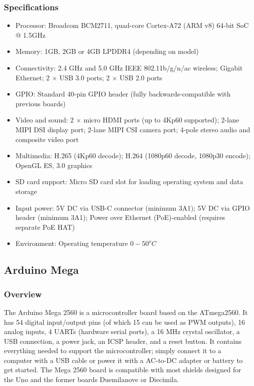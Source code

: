 \subsubsection{Specifications}
\begin{itemize}
    \item Processor: Broadcom BCM2711, quad-core Cortex-A72 (ARM v8) 64-bit SoC @ 1.5GHz
    \item Memory: 1GB, 2GB or 4GB LPDDR4 (depending on model)
    \item Connectivity: 2.4 GHz and 5.0 GHz IEEE 802.11b/g/n/ac wireless; Gigabit Ethernet; 2 \(\times\) USB 3.0 ports; 2 \(\times\) USB 2.0 ports 
    \item GPIO: Standard 40-pin GPIO header (fully backwards-compatible with previous boards)
    \item Video and sound: 2 \(\times\) micro HDMI ports (up to 4Kp60 supported); 2-lane MIPI DSI display port; 2-lane MIPI CSI camera port; 4-pole stereo audio and composite video port
    \item Multimedia: H.265 (4Kp60 decode); H.264 (1080p60 decode, 1080p30 encode); OpenGL ES, 3.0 graphics
    \item SD card support: Micro SD card slot for loading operating system and data storage
    \item Input power: 5V DC via USB-C connector (minimum 3A1); 5V DC via GPIO header (minimum 3A1); Power over Ethernet (PoE)-enabled (requires separate PoE HAT)
    \item Environment: Operating temperature \(0-50^oC\)
\end{itemize}
   
 
\newpage
\subsection{Arduino Mega}
\subsubsection{Overview}

The Arduino Mega 2560 is a microcontroller board based on the ATmega2560. It has 54 digital input/output pins (of which 15 can be used as PWM outputs), 16 analog inputs, 4 UARTs (hardware serial ports), a 16 MHz crystal oscillator, a USB connection, a power jack, an ICSP header, and a reset button. It contains everything needed to support the microcontroller; simply connect it to a computer with a USB cable or power it with a AC-to-DC adapter or battery to get started. The Mega 2560 board is compatible with most shields designed for the Uno and the former boards Duemilanove or Diecimila.

